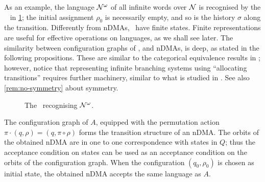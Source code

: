 As an example, the language $\mathcal{N}^\omega$ of all infinite words over $\mathcal{N}$ is recognised by the \hdma\ %
in \cref{fig:hd-names-omega}; the initial assignment $\rho_0$ is necessarily empty, and so is the history $\sigma$ along the transition.
%
%
Differently from nDMAs, \hdmas\ have finite states. 
Finite representations are useful for effective operations on languages, as we shall see later. The similarity between configuration graphs of \hdmas, and nDMAs, is deep, as stated in the following propositions. These are similar to the categorical equivalence results in \cite{GADDUCCIETAL,STATON}; however, notice that representing infinite branching systems using  ``allocating transitions'' requires further machinery, similar to what is studied in \cite{CM10}. See also \cref{rem:no-symmetry} about symmetry.

\begin{figure}
\centering
{}
\caption{\label{fig:hd-names-omega}The \hdma\ recognising $\mathcal{N}^\omega$.}
\end{figure}

\begin{proposition}\label{pro:nset-to-nom}
 The configuration graph of $A$, equipped with the permutation action $\pi \cdot (q,\rho) = (q,\pi \circ \rho)$ forms the transition structure of an nDMA. The orbits of the obtained nDMA are in one to one correspondence with states in $Q$; thus the acceptance condition on states can be used as an acceptance condition on the orbits of the configuration graph. When the configuration $(q_0,\rho_0)$ is chosen as initial state, the obtained nDMA accepts the same language as $A$.
\end{proposition}

